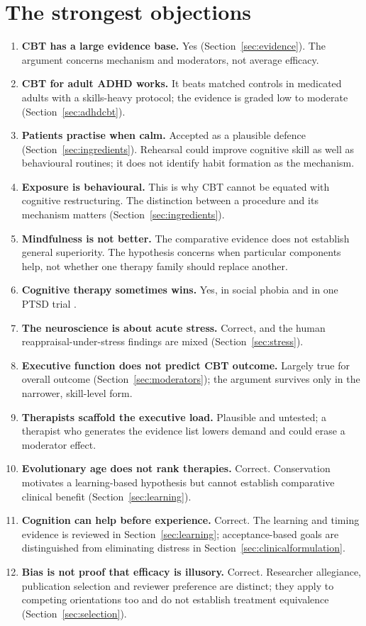 \section{The strongest objections}\label{sec:objections}
\begin{enumerate}
\item \textbf{CBT has a large evidence base.} Yes (Section~\ref{sec:evidence}).
The argument concerns mechanism and moderators, not average efficacy.
\item \textbf{CBT for adult ADHD works.} It beats matched controls in medicated adults with a skills-heavy protocol; the evidence is graded low to moderate (Section~\ref{sec:adhdcbt}).
\item \textbf{Patients practise when calm.} Accepted as a plausible defence (Section~\ref{sec:ingredients}).
Rehearsal could improve cognitive skill as well as behavioural routines; it does not identify habit formation as the mechanism.
\item \textbf{Exposure is behavioural.} This is why CBT cannot be equated with cognitive restructuring.
The distinction between a procedure and its mechanism matters (Section~\ref{sec:ingredients}).
\item \textbf{Mindfulness is not better.} The comparative evidence does not establish general superiority.
The hypothesis concerns when particular components help, not whether one therapy family should replace another.
\item \textbf{Cognitive therapy sometimes wins.} Yes, in social phobia \citep{ougrin2011exposure} and in one PTSD trial \citep{bryant2008cr}.
\item \textbf{The neuroscience is about acute stress.} Correct, and the human reappraisal-under-stress findings are mixed (Section~\ref{sec:stress}).
\item \textbf{Executive function does not predict CBT outcome.} Largely true for overall outcome (Section~\ref{sec:moderators}); the argument survives only in the narrower, skill-level form.
\item \textbf{Therapists scaffold the executive load.} Plausible and untested; a therapist who generates the evidence list lowers demand and could erase a moderator effect.
\item \textbf{Evolutionary age does not rank therapies.} Correct.
Conservation motivates a learning-based hypothesis but cannot establish comparative clinical benefit (Section~\ref{sec:learning}).
\item \textbf{Cognition can help before experience.} Correct.
The learning and timing evidence is reviewed in Section~\ref{sec:learning}; acceptance-based goals are distinguished from eliminating distress in Section~\ref{sec:clinicalformulation}.
\item \textbf{Bias is not proof that efficacy is illusory.} Correct.
Researcher allegiance, publication selection and reviewer preference are distinct; they apply to competing orientations too and do not establish treatment equivalence (Section~\ref{sec:selection}).
\end{enumerate}
